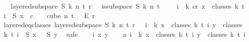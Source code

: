 \begin{isabellebody}
\ \ \ {\isachardoublequoteopen}layered{\isacharunderscore}{\kern0pt}subspace\ S\ k\ n\ t\ r\ {\isasymchi}\ {\isasymequiv}\ {\isacharparenleft}{\kern0pt}is{\isacharunderscore}{\kern0pt}subspace\ S\ k\ n\ {\isacharparenleft}{\kern0pt}t\ {\isacharplus}{\kern0pt}\ {}{\isacharparenright}{\kern0pt}\ \ {\isasymand}\ {\isacharparenleft}{\kern0pt}{\isasymforall}i\ {\isasymin}\ {\isacharbraceleft}{\kern0pt}{\isachardot}{\kern0pt}{\isachardot}{\kern0pt}k{\isacharbraceright}{\kern0pt}{\isachardot}{\kern0pt}\ {\isasymexists}c{\isacharless}{\kern0pt}r{\isachardot}{\kern0pt}\ {\isasymforall}x\ {\isasymin}\ classes\ k\ t\ i{\isachardot}{\kern0pt}\ {\isasymchi}\ {\isacharparenleft}{\kern0pt}S\ x{\isacharparenright}{\kern0pt}\ {\isacharequal}{\kern0pt}\ c{\isacharparenright}{\kern0pt}{\isacharparenright}{\kern0pt}\ {\isasymand}\ {\isasymchi}\ {\isasymin}\ cube\ n\ {\isacharparenleft}{\kern0pt}t\ {\isacharplus}{\kern0pt}\ {}{\isacharparenright}{\kern0pt}\ {\isasymrightarrow}\isactrlsub E\ {\isacharbraceleft}{\kern0pt}{\isachardot}{\kern0pt}{\isachardot}{\kern0pt}{\isacharless}{\kern0pt}r{\isacharbraceright}{\kern0pt}{\isachardoublequoteclose}\isanewline
\isanewline
\isanewline
{}\isamarkupfalse%
\ layered{\isacharunderscore}{\kern0pt}eq{\isacharunderscore}{\kern0pt}classes{\isacharcolon}{\kern0pt}\ layered{\isacharunderscore}{\kern0pt}subspace\ S\ k\ n\ t\ r\ {\isasymchi}{\isachardoublequoteclose}\ \ {\isachardoublequoteopen}{\isasymforall}i\ {\isasymin}\ {\isacharbraceleft}{\kern0pt}{\isachardot}{\kern0pt}{\isachardot}{\kern0pt}k{\isacharbraceright}{\kern0pt}{\isachardot}{\kern0pt}\ {\isasymforall}x\ {\isasymin}\ classes\ k\ t\ i{\isachardot}{\kern0pt}\ {\isasymforall}y\ {\isasymin}\ classes\ k\ t\ i{\isachardot}{\kern0pt}\ {\isasymchi}\ {\isacharparenleft}{\kern0pt}S\ x{\isacharparenright}{\kern0pt}\ {\isacharequal}{\kern0pt}\ {\isasymchi}\ {\isacharparenleft}{\kern0pt}S\ y{\isacharparenright}{\kern0pt}{\isachardoublequoteclose}\ \isanewline
%
\isadelimproof
%
\endisadelimproof
%
\isatagproof
{}\isamarkupfalse%
\ {\isacharparenleft}{\kern0pt}safe{\isacharparenright}{\kern0pt}\isanewline
\ \ \isamarkupfalse%
\ i\ x\ y\isanewline
\ \ \isamarkupfalse%
\ a{\isacharcolon}{\kern0pt}\ {\isachardoublequoteopen}i\ {\isasymle}\ k{\isachardoublequoteclose}\ {\isachardoublequoteopen}x\ {\isasymin}\ classes\ k\ t\ i{\isachardoublequoteclose}\ {\isachardoublequoteopen}y\ {\isasymin}\ classes\ k\ t\ i{\isachardoublequoteclose}\isanewline

\end{isabellebody}
